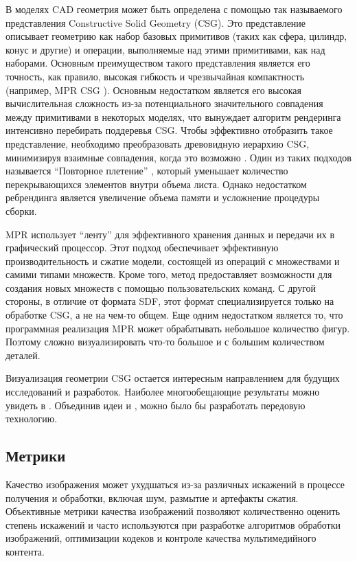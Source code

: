 \documentclass[a4paper,hidelinks,12pt]{article}
\begin{document}
В моделях CAD геометрия может быть определена с помощью так называемого представления Constructive Solid Geometry (CSG). 
Это представление описывает геометрию как набор базовых примитивов (таких как сфера, цилиндр, конус и другие) и 
операции, выполняемые над этими примитивами, как над наборами. Основным преимуществом такого представления является 
его точность, как правило, высокая гибкость и чрезвычайная компактность (например, MPR CSG \cite{mpr}). 
Основным недостатком является его высокая вычислительная сложность из-за потенциального значительного совпадения между 
примитивами в некоторых моделях, что вынуждает алгоритм рендеринга интенсивно перебирать поддеревья CSG. Чтобы эффективно 
отобразить такое представление, необходимо преобразовать древовидную иерархию CSG, минимизируя взаимные совпадения, когда это возможно \cite{bogolepov}. 
Один из таких подходов называется “Повторное плетение” \cite{itlbvh}, который уменьшает количество перекрывающихся элементов 
внутри объема листа. Однако недостатком ребрендинга является увеличение объема памяти и усложнение процедуры сборки.

MPR использует “ленту” для эффективного хранения данных и передачи их в графический процессор. Этот подход 
обеспечивает эффективную производительность и сжатие модели, состоящей из операций с множествами и самими типами множеств. 
Кроме того, метод предоставляет возможности для создания новых множеств с помощью пользовательских команд. 
С другой стороны, в отличие от формата SDF, этот формат специализируется только на обработке CSG, 
а не на чем-то общем. Еще одним недостатком является то, что программная реализация MPR может обрабатывать небольшое количество фигур. 
Поэтому сложно визуализировать что-то большое и с большим количеством деталей.

Визуализация геометрии CSG остается интересным направлением для будущих исследований и разработок. 
Наиболее многообещающие результаты можно увидеть в \cite{bogolepov}. Объединив идеи \cite{bogolepov}\cite{itlbvh} и \cite{mpr}, можно было бы разработать передовую технологию.

\newpage

\subsection{Метрики}

Качество изображения может ухудшаться из-за различных искажений в процессе получения и обработки, включая шум, 
размытие и артефакты сжатия. Объективные метрики качества изображений позволяют количественно оценить 
степень искажений и часто используются при разработке алгоритмов обработки изображений, оптимизации кодеков и 
контроле качества мультимедийного контента.
\end{document}
